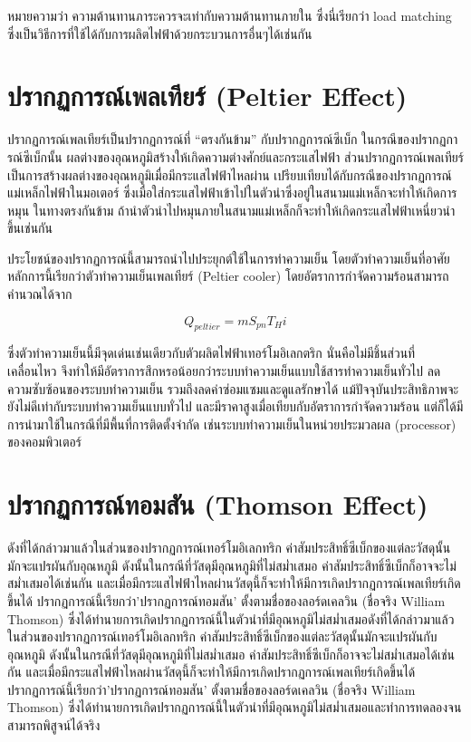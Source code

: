 \documentclass[a4paper,nobib,openany]{tufte-book}
\begin{document}
หมายความว่า ความต้านทานภาระควรจะเท่ากับความต้านทานภายใน ซึ่งนี่เรียกว่า
load matching
ซึ่งเป็นวิธีการที่ใช้ได้กับการผลิตไฟฟ้าด้วยกระบวนการอื่นๆได้เช่นกัน

\section{ปรากฏการณ์เพลเทียร์ (Peltier Effect)}
\label{sec:org5fed0c9}
ปรากฏการณ์เพลเทียร์เป็นปรากฏการณ์ที่ ``ตรงกันข้าม'' กับปรากฏการณ์ซีเบ็ก
ในกรณีของปรากฏการณ์ซีเบ็กนั้น
ผลต่างของอุณหภูมิสร้างให้เกิดความต่างศักย์และกระแสไฟฟ้า
ส่วนปรากฏการณ์เพลเทียร์เป็นการสร้างผลต่างของอุณหภูมิเมื่อมีกระแสไฟฟ้าไหลผ่าน
เปรียบเทียบได้กับกรณีของปรากฏการณ์แม่เหล็กไฟฟ้าในมอเตอร์
ซึ่งเมื่อใส่กระแสไฟฟ้าเข้าไปในตัวนำซึ่งอยู่ในสนามแม่เหล็กจะทำให้เกิดการหมุน
ในทางตรงกันข้าม
ถ้านำตัวนำไปหมุนภายในสนามแม่เหล็กก็จะทำให้เกิดกระแสไฟฟ้าเหนี่ยวนำขึ้นเช่นกัน

ประโยชน์ของปรากฏการณ์นี้สามารถนำไปประยุกต์ใช้ในการทำความเย็น
โดยตัวทำความเย็นที่อาศัยหลักการนี้เรียกว่าตัวทำความเย็นเพลเทียร์
(Peltier cooler) โดยอัตราการกำจัดความร้อนสามารถคำนวณได้จาก

\begin{equation}
  Q_{peltier} = m S_{pn} T_H i
\end{equation}

ซึ่งตัวทำความเย็นนี้มีจุดเด่นเช่นเดียวกับตัวผลิตไฟฟ้าเทอร์โมอิเลกตริก
นั่นคือไม่มีชิ้นส่วนที่เคลื่อนไหว
จึงทำให้มีอัตราการสึกหรอน้อยกว่าระบบทำความเย็นแบบใช้สารทำความเย็นทั่วไป
ลดความซับซ้อนของระบบทำความเย็น รวมถึงลดค่าซ่อมแซมและดูแลรักษาได้
แม้ปัจจุบันประสิทธิภาพจะยังไม่ดีเท่ากับระบบทำความเย็นแบบทั่วไป
และมีราคาสูงเมื่อเทียบกับอัตราการกำจัดความร้อน
แต่ก็ได้มีการนำมาใช้ในกรณีที่มีพื้นที่การติดตั้งจำกัด
เช่นระบบทำความเย็นในหน่วยประมวลผล (processor) ของคอมพิวเตอร์

\section{ปรากฏการณ์ทอมสัน (Thomson Effect)}
\label{sec:org69e9ad7}
ดังที่ได้กล่าวมาแล้วในส่วนของปรากฏการณ์เทอร์โมอิเลกทริก
ค่าสัมประสิทธิ์ซีเบ็กของแต่ละวัสดุนั้นมักจะแปรผันกับอุณหภูมิ
ดังนั้นในกรณีที่วัสดุมีอุณหภูมิที่ไม่สม่ำเสมอ
ค่าสัมประสิทธิ์ซีเบ็กก็อาจจะไม่สม่ำเสมอได้เช่นกัน
และเมื่อมีกระแสไฟฟ้าไหลผ่านวัสดุนี้ก็จะทำให้มีการเกิดปรากฏการณ์เพลเทียร์เกิดขึ้นได้
ปรากฏการณ์นี้เรียกว่า'ปรากฏการณ์ทอมสัน' ตั้งตามชื่อของลอร์ดเคลวิน
(ชื่อจริง William Thomson)
ซึ่งได้ทำนายการเกิดปรากฏการณ์นี้ในตัวนำที่มีอุณหภูมิไม่สม่ำเสมอดังที่ได้กล่าวมาแล้วในส่วนของปรากฏการณ์เทอร์โมอิเลกทริก
ค่าสัมประสิทธิ์ซีเบ็กของแต่ละวัสดุนั้นมักจะแปรผันกับอุณหภูมิ
ดังนั้นในกรณีที่วัสดุมีอุณหภูมิที่ไม่สม่ำเสมอ
ค่าสัมประสิทธิ์ซีเบ็กก็อาจจะไม่สม่ำเสมอได้เช่นกัน
และเมื่อมีกระแสไฟฟ้าไหลผ่านวัสดุนี้ก็จะทำให้มีการเกิดปรากฏการณ์เพลเทียร์เกิดขึ้นได้
ปรากฏการณ์นี้เรียกว่า'ปรากฏการณ์ทอมสัน' ตั้งตามชื่อของลอร์ดเคลวิน
(ชื่อจริง William Thomson)
ซึ่งได้ทำนายการเกิดปรากฏการณ์นี้ในตัวนำที่มีอุณหภูมิไม่สม่ำเสมอและทำการทดลองจนสามารถพิสูจน์ได้จริง
\end{document}
